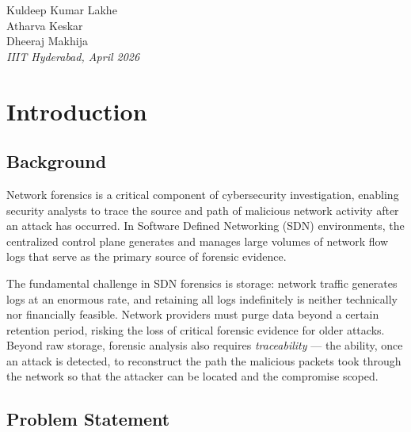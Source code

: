 \documentclass[12pt, a4paper]{report}
\begin{document}
\vspace{1cm}
\begin{flushright}
Kuldeep Kumar Lakhe\\
Atharva Keskar\\
Dheeraj Makhija\\
\vspace{4pt}
\textit{IIIT Hyderabad, April 2026}
\end{flushright}

\newpage
\tableofcontents

\newpage
\listoffigures
{}

\listoftables
{}

\newpage
\chapter{Introduction}

\section{Background}

Network forensics is a critical component of cybersecurity investigation,
enabling security analysts to trace the source and path of malicious network
activity after an attack has occurred. In Software Defined Networking (SDN)
environments, the centralized control plane generates and manages large
volumes of network flow logs that serve as the primary source of forensic
evidence.

The fundamental challenge in SDN forensics is storage: network traffic
generates logs at an enormous rate, and retaining all logs indefinitely is
neither technically nor financially feasible. Network providers must purge
data beyond a certain retention period, risking the loss of critical forensic
evidence for older attacks. Beyond raw storage, forensic analysis also
requires \textit{traceability} --- the ability, once an attack is detected,
to reconstruct the path the malicious packets took through the network so
that the attacker can be located and the compromise scoped.

\section{Problem Statement}
\end{document}

